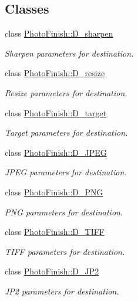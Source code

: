 \subsection*{Classes}
\begin{DoxyCompactItemize}
\item 
class \hyperlink{class_photo_finish_1_1_d__sharpen}{Photo\+Finish\+::\+D\+\_\+sharpen}
\begin{DoxyCompactList}\small\item\em Sharpen parameters for destination. \end{DoxyCompactList}\item 
class \hyperlink{class_photo_finish_1_1_d__resize}{Photo\+Finish\+::\+D\+\_\+resize}
\begin{DoxyCompactList}\small\item\em Resize parameters for destination. \end{DoxyCompactList}\item 
class \hyperlink{class_photo_finish_1_1_d__target}{Photo\+Finish\+::\+D\+\_\+target}
\begin{DoxyCompactList}\small\item\em Target parameters for destination. \end{DoxyCompactList}\item 
class \hyperlink{class_photo_finish_1_1_d___j_p_e_g}{Photo\+Finish\+::\+D\+\_\+\+J\+P\+EG}
\begin{DoxyCompactList}\small\item\em J\+P\+EG parameters for destination. \end{DoxyCompactList}\item 
class \hyperlink{class_photo_finish_1_1_d___p_n_g}{Photo\+Finish\+::\+D\+\_\+\+P\+NG}
\begin{DoxyCompactList}\small\item\em P\+NG parameters for destination. \end{DoxyCompactList}\item 
class \hyperlink{class_photo_finish_1_1_d___t_i_f_f}{Photo\+Finish\+::\+D\+\_\+\+T\+I\+FF}
\begin{DoxyCompactList}\small\item\em T\+I\+FF parameters for destination. \end{DoxyCompactList}\item 
class \hyperlink{class_photo_finish_1_1_d___j_p2}{Photo\+Finish\+::\+D\+\_\+\+J\+P2}
\begin{DoxyCompactList}\small\item\em J\+P2 parameters for destination. \end{DoxyCompactList}\item 

\end{DoxyCompactItemize}
